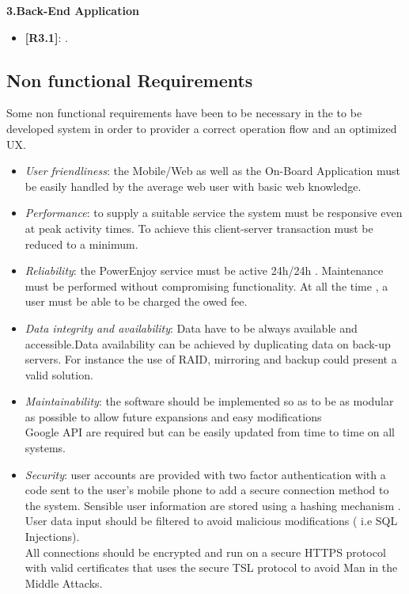 \documentclass[12pt]{article}
\begin{document}
 	 	\textbf{3.Back-End Application}
		\begin{itemize}
	 		\item{\textbf{[R3.1]}}: .
 	 	\end{itemize}
	
	  \subsection{Non functional Requirements} 
	  	Some non functional requirements have been to be necessary in the to be developed 
	  	system in order to provider a correct operation flow and an optimized UX.
		\begin{itemize}
			\item \textit{User friendliness}: the Mobile/Web as well as the On-Board 
				  Application must be easily handled by the average web user with basic web 	
				  knowledge.
			\item \textit{Performance}: to supply a suitable service the system must be 
				  responsive even at peak activity times. To achieve this client-server 
				  transaction must be reduced to a minimum.
		 	\item \textit{Reliability}: the PowerEnjoy service must be active 24h/24h . 
		 		  Maintenance must be performed without compromising functionality. At all the 
		 		  time , a user must be able to be charged the owed fee.	
		 	\item \textit{Data integrity and availability}: 
	   		 	  Data have to be always available and accessible.Data availability can be 
	   		 	  achieved by duplicating data on back-up servers. For instance the use of 
	   		 	  RAID, mirroring and backup could present a valid solution.

		 	\item \textit{Maintainability}: the software should be implemented so as to be as 
		 		  modular as possible to allow future expansions and easy modifications\\
		 		  Google API are required but can be easily updated from time to time on all 
		 		  systems.
		 	\item \textit{Security}: user accounts are provided with two factor authentication 
		 		  with a code sent to the user's mobile phone to add a secure connection 
		 		  method to the system. Sensible user information are stored using a hashing 
		 		  mechanism .\\User data input should be filtered to avoid malicious 
		 		  modifications ( i.e SQL Injections). \\All connections should be encrypted 
		 		  and run on a secure HTTPS protocol with valid certificates that uses the 
		 		  secure TSL protocol to avoid Man in the Middle Attacks.
		\end{itemize}
		
\end{document}
